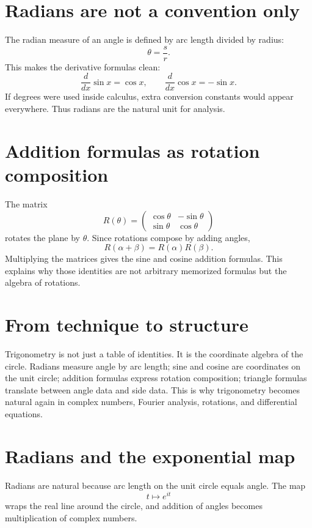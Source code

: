 \section{Radians are not a convention only}

The radian measure of an angle is defined by arc length divided by radius:
\[
  \theta=\frac{s}{r}.
\]
This makes the derivative formulas clean:
\[
  \frac{d}{dx}\sin x=\cos x,\qquad
  \frac{d}{dx}\cos x=-\sin x.
\]
If degrees were used inside calculus, extra conversion constants would appear everywhere.  Thus radians are the natural unit for analysis.

\section{Addition formulas as rotation composition}

The matrix
\[
  R(\theta)=\begin{pmatrix}\cos\theta&-\sin\theta\\ \sin\theta&\cos\theta\end{pmatrix}
\]
rotates the plane by \(\theta\).  Since rotations compose by adding angles,
\[
  R(\alpha+\beta)=R(\alpha)R(\beta).
\]
Multiplying the matrices gives the sine and cosine addition formulas.  This explains why those identities are not arbitrary memorized formulas but the algebra of rotations.

\section{From technique to structure}

Trigonometry is not just a table of identities.  It is the coordinate algebra of the circle.  Radians measure angle by arc length; sine and cosine are coordinates on the unit circle; addition formulas express rotation composition; triangle formulas translate between angle data and side data.  This is why trigonometry becomes natural again in complex numbers, Fourier analysis, rotations, and differential equations.

\section{Radians and the exponential map}

Radians are natural because arc length on the unit circle equals angle.  The map
\[
  t\mapsto e^{it}
\]
wraps the real line around the circle, and addition of angles becomes multiplication of complex numbers.

